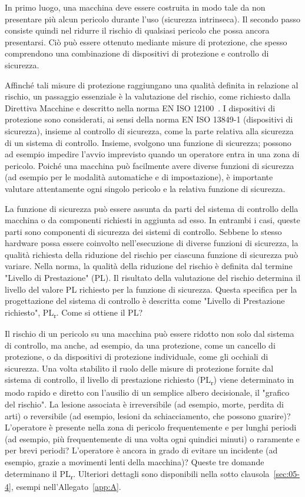In primo luogo, una macchina deve essere costruita in modo tale da non presentare più alcun pericolo durante l'uso (sicurezza intrinseca). Il secondo passo consiste quindi nel ridurre il rischio di qualsiasi pericolo che possa ancora presentarsi. Ciò può essere ottenuto mediante misure di protezione, che spesso comprendono una combinazione di dispositivi di protezione e controllo di sicurezza.

Affinché tali misure di protezione raggiungano una qualità definita in relazione al rischio, un passaggio essenziale è la valutazione del rischio, come richiesto dalla Direttiva Macchine e descritto nella norma EN ISO 12100~\cite{eniso12100}. I dispositivi di protezione sono considerati, ai sensi della norma EN ISO 13849-1 (dispositivi di sicurezza), insieme al controllo di sicurezza, come la parte relativa alla sicurezza di un sistema di controllo. Insieme, svolgono una funzione di sicurezza; possono ad esempio impedire l'avvio imprevisto quando un operatore entra in una zona di pericolo. Poiché una macchina può facilmente avere diverse funzioni di sicurezza (ad esempio per le modalità automatiche e di impostazione), è importante valutare attentamente ogni singolo pericolo e la relativa funzione di sicurezza.

La funzione di sicurezza può essere assunta da parti del sistema di controllo della macchina o da componenti richiesti in aggiunta ad esso. In entrambi i casi, queste parti sono componenti di sicurezza dei sistemi di controllo. Sebbene lo stesso hardware possa essere coinvolto nell'esecuzione di diverse funzioni di sicurezza, la qualità richiesta della riduzione del rischio per ciascuna funzione di sicurezza può variare. Nella norma, la qualità della riduzione del rischio è definita dal termine "Livello di Prestazione" (PL). Il risultato della valutazione del rischio determina il livello del valore PL richiesto per la funzione di sicurezza. Questa specifica per la progettazione del sistema di controllo è descritta come "Livello di Prestazione richiesto", PL\textsubscript{\small r}. Come si ottiene il PL?

Il rischio di un pericolo su una macchina può essere ridotto non solo dal sistema di controllo, ma anche, ad esempio, da una protezione, come un cancello di protezione, o da dispositivi di protezione individuale, come gli occhiali di sicurezza. Una volta stabilito il ruolo delle misure di protezione fornite dal sistema di controllo, il livello di prestazione richiesto (PL\textsubscript{\small r}) viene determinato in modo rapido e diretto con l'ausilio di un semplice albero decisionale, il "grafico del rischio". La lesione associata è irreversibile (ad esempio, morte, perdita di arti) o reversibile (ad esempio, lesioni da schiacciamento, che possono guarire)? L'operatore è presente nella zona di pericolo frequentemente e per lunghi periodi (ad esempio, più frequentemente di una volta ogni quindici minuti) o raramente e per brevi periodi? L'operatore è ancora in grado di evitare un incidente (ad esempio, grazie a movimenti lenti della macchina)?
Queste tre domande determinano il PL\textsubscript{\small r}. Ulteriori dettagli sono disponibili nella sotto clausola~\ref{sec:05-4}, esempi nell'Allegato~\ref{app:A}.

